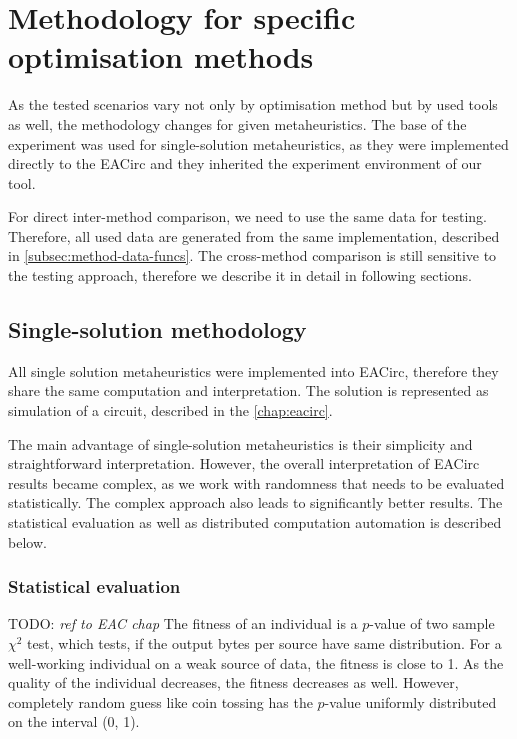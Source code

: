 \documentclass[
  print, %
  Table,   %
  nolof,     %
  nolot,     %
  11pt, %
  oneside  %
]{fithesis3}
\newcommand{\todo}[1]{TODO: \textit{#1}}
\begin{document}
\section{Methodology for specific optimisation methods}
\label{sec:method-spec}

As the tested scenarios vary not only by optimisation method but by used tools as well, the methodology changes for given metaheuristics. The base of the experiment was used for single-solution metaheuristics, as they were implemented directly to the EACirc and they inherited the experiment environment of our tool.

For direct inter-method comparison, we need to use the same data for testing. Therefore, all used data are generated from the same implementation, described in \cref{subsec:method-data-funcs}. The cross-method comparison is still sensitive to the testing approach, therefore we describe it in detail in following sections.


\subsection{Single-solution methodology}
\label{subsec:method-spec-ss}

All single solution metaheuristics were implemented into EACirc, therefore they share the same computation and interpretation. The solution is represented as simulation of a circuit, described in the \cref{chap:eacirc}.

The main advantage of single-solution metaheuristics is their simplicity and straightforward interpretation. However, the overall interpretation of EACirc results became complex, as we work with randomness that needs to be evaluated statistically. The complex approach also leads to significantly better results. The statistical evaluation as well as distributed computation automation is described below.


\subsubsection{\textbf{Statistical evaluation}}
\label{subsubsec:method-spec-ss-stat}

\todo{ref to EAC chap}
The fitness of an individual is a $p$-value of two sample $\chi^{2}$ test, which tests, if the output bytes per source have same distribution. For a well-working individual on a weak source of data, the fitness is close to 1. As the quality of the individual decreases, the fitness decreases as well. However, completely random guess like coin tossing has the $p$-value uniformly distributed on the interval (0, 1).
\end{document}
